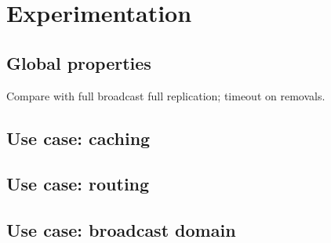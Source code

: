 
\section{Experimentation}
\label{sec:experimentation}

\subsection{Global properties}

Compare with full broadcast full replication; timeout on removals.

\subsection{Use case: caching}

\subsection{Use case: routing}

\subsection{Use case: broadcast domain}

